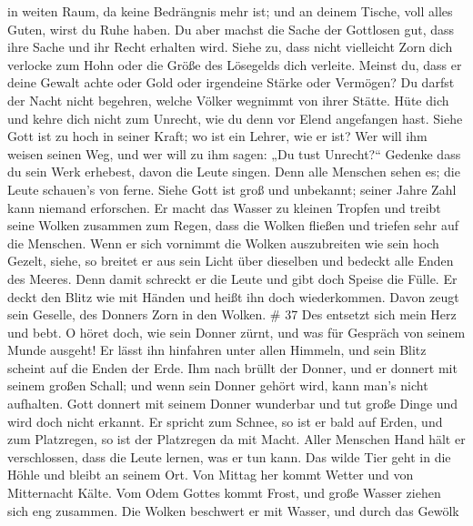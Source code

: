in weiten Raum, da keine Bedrängnis mehr ist; und an deinem Tische, voll
alles Guten, wirst du Ruhe haben.  Du aber machst die Sache
der Gottlosen gut, dass ihre Sache und ihr Recht erhalten wird.
 Siehe zu, dass nicht vielleicht Zorn dich verlocke zum
Hohn oder die Größe des Lösegelds dich verleite.  Meinst
du, dass er deine Gewalt achte oder Gold oder irgendeine Stärke oder
Vermögen?  Du darfst der Nacht nicht begehren, welche
Völker wegnimmt von ihrer Stätte.  Hüte dich und kehre dich
nicht zum Unrecht, wie du denn vor Elend angefangen hast. 
Siehe Gott ist zu hoch in seiner Kraft; wo ist ein Lehrer, wie er ist?
 Wer will ihm weisen seinen Weg, und wer will zu ihm sagen:
„Du tust Unrecht?{}``  Gedenke dass du sein Werk erhebest,
davon die Leute singen.  Denn alle Menschen sehen es; die
Leute schauen's von ferne.  Siehe Gott ist groß und
unbekannt; seiner Jahre Zahl kann niemand erforschen.  Er
macht das Wasser zu kleinen Tropfen und treibt seine Wolken zusammen zum
Regen,  dass die Wolken fließen und triefen sehr auf die
Menschen.  Wenn er sich vornimmt die Wolken auszubreiten
wie sein hoch Gezelt,  siehe, so breitet er aus sein Licht
über dieselben und bedeckt alle Enden des Meeres.  Denn
damit schreckt er die Leute und gibt doch Speise die Fülle.
 Er deckt den Blitz wie mit Händen und heißt ihn doch
wiederkommen.  Davon zeugt sein Geselle, des Donners Zorn
in den Wolken. \# 37  Des entsetzt sich mein Herz und bebt.
 O höret doch, wie sein Donner zürnt, und was für Gespräch
von seinem Munde ausgeht!  Er lässt ihn hinfahren unter
allen Himmeln, und sein Blitz scheint auf die Enden der Erde.
 Ihm nach brüllt der Donner, und er donnert mit seinem
großen Schall; und wenn sein Donner gehört wird, kann man's nicht
aufhalten.  Gott donnert mit seinem Donner wunderbar und tut
große Dinge und wird doch nicht erkannt.  Er spricht zum
Schnee, so ist er bald auf Erden, und zum Platzregen, so ist der
Platzregen da mit Macht.  Aller Menschen Hand hält er
verschlossen, dass die Leute lernen, was er tun kann.  Das
wilde Tier geht in die Höhle und bleibt an seinem Ort.  Von
Mittag her kommt Wetter und von Mitternacht Kälte.  Vom
Odem Gottes kommt Frost, und große Wasser ziehen sich eng zusammen.
 Die Wolken beschwert er mit Wasser, und durch das Gewölk
